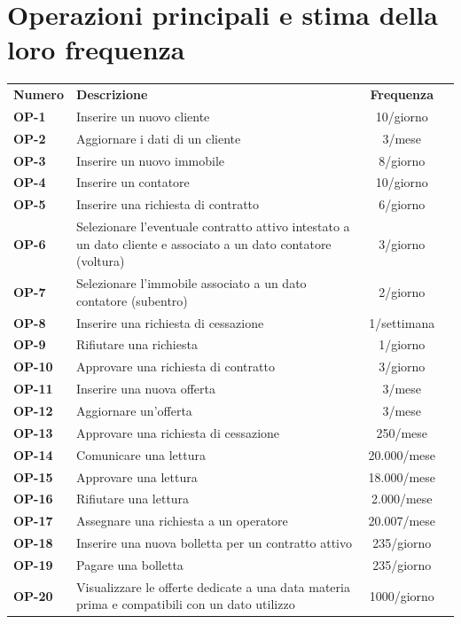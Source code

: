 \documentclass[a4paper,12pt]{report}
\begin{document}
\section{Operazioni principali e stima della loro frequenza}
\begin{longtable}{l p{10cm} c r}
    \hline
    \textbf{Numero} & \textbf{Descrizione} & \textbf{Frequenza}\\ [0.5ex]
    \textbf{OP-1} & Inserire un nuovo cliente & 10/giorno \\
    \textbf{OP-2} & Aggiornare i dati di un cliente & 3/mese \\
    \textbf{OP-3} & Inserire un nuovo immobile & 8/giorno \\
    \textbf{OP-4} & Inserire un contatore & 10/giorno \\
    \textbf{OP-5} & Inserire una richiesta di contratto & 6/giorno \\
    \textbf{OP-6} & Selezionare l'eventuale contratto attivo intestato a un dato cliente e associato a un dato contatore (voltura) & 3/giorno \\
    \textbf{OP-7} & Selezionare l'immobile associato a un dato contatore (subentro) & 2/giorno \\
    \textbf{OP-8} & Inserire una richiesta di cessazione & 1/settimana \\
    \textbf{OP-9} & Rifiutare una richiesta & 1/giorno \\
    \textbf{OP-10} & Approvare una richiesta di contratto & 3/giorno \\
    \textbf{OP-11} & Inserire una nuova offerta & 3/mese \\
    \textbf{OP-12} & Aggiornare un'offerta & 3/mese \\
    \textbf{OP-13} & Approvare una richiesta di cessazione & 250/mese \\
    \textbf{OP-14} & Comunicare una lettura & 20.000/mese \\
    \textbf{OP-15} & Approvare una lettura & 18.000/mese \\
    \textbf{OP-16} & Rifiutare una lettura & 2.000/mese \\
    \textbf{OP-17} & Assegnare una richiesta a un operatore & 20.007/mese \\
    \textbf{OP-18} & Inserire una nuova bolletta per un contratto attivo & 235/giorno \\
    \textbf{OP-19} & Pagare una bolletta & 235/giorno \\
    \textbf{OP-20} & Visualizzare le offerte dedicate a una data materia prima e compatibili con un dato utilizzo & 1000/giorno \\

\end{longtable}
\end{document}
